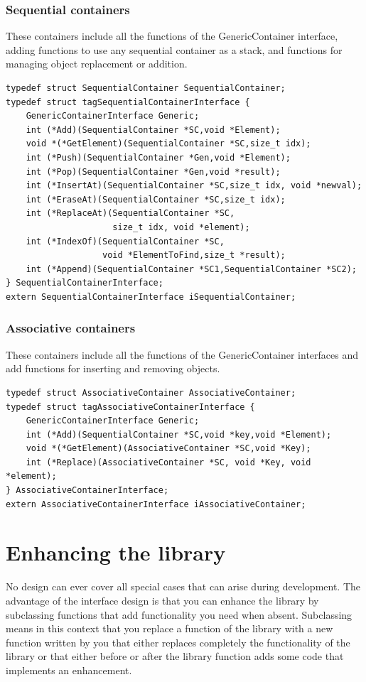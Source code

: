 \documentclass[12pt,a4paper]{memoir} %
\begin{document}
{{\subsection{Sequential containers}
These containers include all the functions of the GenericContainer interface, adding functions to use any sequential container as a stack, and functions for managing object replacement or addition.
\begin{verbatim}
typedef struct SequentialContainer SequentialContainer;
typedef struct tagSequentialContainerInterface {
    GenericContainerInterface Generic;
    int (*Add)(SequentialContainer *SC,void *Element);
    void *(*GetElement)(SequentialContainer *SC,size_t idx);
    int (*Push)(SequentialContainer *Gen,void *Element);
    int (*Pop)(SequentialContainer *Gen,void *result);
    int (*InsertAt)(SequentialContainer *SC,size_t idx, void *newval);
    int (*EraseAt)(SequentialContainer *SC,size_t idx);
    int (*ReplaceAt)(SequentialContainer *SC, 
                     size_t idx, void *element);
    int (*IndexOf)(SequentialContainer *SC,
                   void *ElementToFind,size_t *result);
    int (*Append)(SequentialContainer *SC1,SequentialContainer *SC2);
} SequentialContainerInterface;
extern SequentialContainerInterface iSequentialContainer;
\end{verbatim}
\subsection{Associative containers}
These containers include all the functions of the GenericContainer interfaces and add functions for inserting and removing objects.
\begin{verbatim}
typedef struct AssociativeContainer AssociativeContainer;
typedef struct tagAssociativeContainerInterface {
    GenericContainerInterface Generic;
    int (*Add)(SequentialContainer *SC,void *key,void *Element);
    void *(*GetElement)(AssociativeContainer *SC,void *Key);
    int (*Replace)(AssociativeContainer *SC, void *Key, void *element);
} AssociativeContainerInterface;
extern AssociativeContainerInterface iAssociativeContainer;
\end{verbatim} 
\chapter{Enhancing the library}
No design can ever cover all special cases that can arise during development. The advantage of the interface design is that you can enhance the library by subclassing functions that add functionality you need when absent.
Subclassing means in this context that you replace a function of the library with a new function written by you that either replaces completely the functionality of the library or that either before or after the library function adds some code that implements an enhancement.

}}
\end{document}
